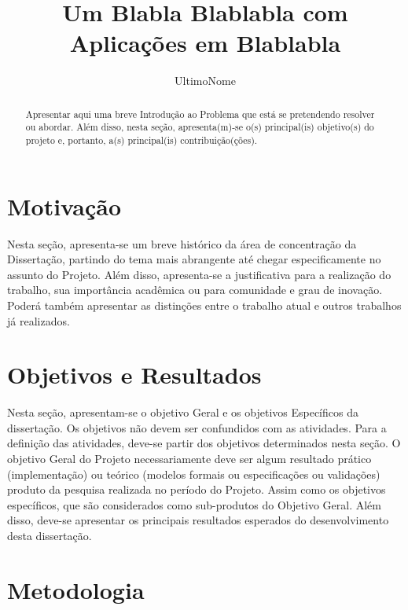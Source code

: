 \documentclass[diss-proposta,nocipinfo]{texufpel}
\title{Um Blabla Blablabla com Aplicações em Blablabla}
\author{UltimoNome}{Nome Sobrenome de}
\begin{document}

\maketitle 
\sloppy

\begin{abstract}
  Apresentar aqui uma breve Introdução ao Problema que está se
  pretendendo resolver ou abordar. Além disso, nesta seção,
  apresenta(m)-se o(s) principal(is) objetivo(s) do projeto e,
  portanto, a(s) principal(is) contribuição(ções).
\end{abstract}

\chapter{Motivação}

Nesta seção, apresenta-se um breve histórico da área de concentração
da Dissertação, partindo do tema mais abrangente até chegar
especificamente no assunto do Projeto. Além disso, apresenta-se a
justificativa para a realização do trabalho, sua importância acadêmica
ou para comunidade e grau de inovação. Poderá também apresentar as
distinções entre o trabalho atual e outros trabalhos já realizados.

\chapter{Objetivos e Resultados}

Nesta seção, apresentam-se o objetivo Geral e os objetivos Específicos
da dissertação. Os objetivos não devem ser confundidos com as
atividades. Para a definição das atividades, deve-se partir dos
objetivos determinados nesta seção. O objetivo Geral do Projeto
necessariamente deve ser algum resultado prático (implementação) ou
teórico (modelos formais ou especificações ou validações) produto da
pesquisa realizada no período do Projeto. Assim como os objetivos
específicos, que são considerados como sub-produtos do Objetivo
Geral. Além disso, deve-se apresentar os principais resultados
esperados do desenvolvimento desta dissertação.

\chapter{Metodologia}
\end{document}
